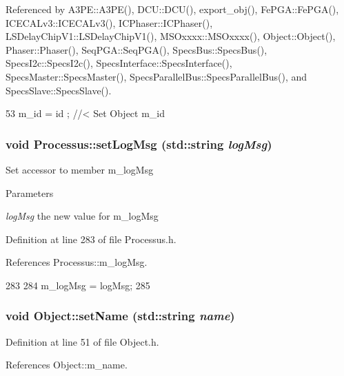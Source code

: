 Referenced by A3PE::A3PE(), DCU::DCU(), export\_\-obj(), FePGA::FePGA(), ICECALv3::ICECALv3(), ICPhaser::ICPhaser(), LSDelayChipV1::LSDelayChipV1(), MSOxxxx::MSOxxxx(), Object::Object(), Phaser::Phaser(), SeqPGA::SeqPGA(), SpecsBus::SpecsBus(), SpecsI2c::SpecsI2c(), SpecsInterface::SpecsInterface(), SpecsMaster::SpecsMaster(), SpecsParallelBus::SpecsParallelBus(), and SpecsSlave::SpecsSlave().


\begin{DoxyCode}
53 { m_id    = id    ; } //< Set Object m_id
\end{DoxyCode}
\hypertarget{classProcessus_a471833f89047aa9a7ff6200a31c17a1d}{
\subsubsection[{setLogMsg}]{\setlength{\rightskip}{0pt plus 5cm}void Processus::setLogMsg (std::string {\em logMsg})}}
\label{classProcessus_a471833f89047aa9a7ff6200a31c17a1d}
Set accessor to member m\_\-logMsg 
\begin{DoxyParams}{Parameters}
\item[{\em logMsg}]the new value for m\_\-logMsg \end{DoxyParams}


Definition at line 283 of file Processus.h.

References Processus::m\_\-logMsg.


\begin{DoxyCode}
283                                     {
284     m_logMsg = logMsg;
285   }
\end{DoxyCode}
\hypertarget{classObject_ae30fea75683c2d149b6b6d17c09ecd0c}{
\subsubsection[{setName}]{\setlength{\rightskip}{0pt plus 5cm}void Object::setName (std::string {\em name})}}
\label{classObject_ae30fea75683c2d149b6b6d17c09ecd0c}


Definition at line 51 of file Object.h.

References Object::m\_\-name.

